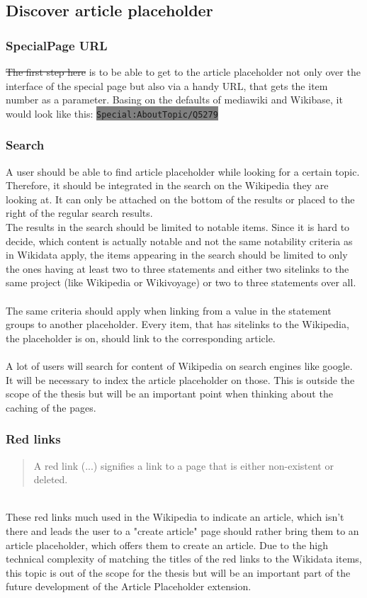 \documentclass[11pt]{article}
\begin{document}
\subsection{Discover article placeholder}
\subsubsection{SpecialPage URL}
\st{The first step here} is to be able to get to the article placeholder not only over the interface of the special page but also via a handy URL, that gets the item number as a parameter. Basing on the defaults of mediawiki and Wikibase, it would look like this: \colorbox{Gray}{\lstinline[basicstyle=\ttfamily\color{white}]|Special:AboutTopic/Q5279|} \\
\subsubsection{Search}
A user should be able to find article placeholder while looking for a certain topic. Therefore, it should be integrated in the search on the Wikipedia they are looking at. It can only be attached on the bottom of the results or placed to the right of the regular search results. \\
The results in the search should be limited to notable items. Since it is hard to decide, which content is actually notable and not the same notability criteria as in Wikidata apply, the items appearing in the search should be limited to only the ones having at least two to three statements and either two sitelinks to the same project (like Wikipedia or Wikivoyage) or two to three statements over all. \\
\\
The same criteria should apply when linking from a value in the statement groups to another placeholder. Every item, that has sitelinks to the Wikipedia, the placeholder is on, should link to the corresponding article. \\
\\
A lot of users will search for content of Wikipedia on search engines like google. It will be necessary to index the article placeholder on those. This is outside the scope of the thesis but will be an important point when thinking about the caching of the pages. 
\subsubsection{Red links}
\begin{quotation}
A red link (...) signifies a link to a page that is either non-existent or deleted. 
\end{quotation} \cite{wiki:01} %
\\
These red links much used in the Wikipedia to indicate an article, which isn't there and leads the user to a "create article" page should rather bring them to an article placeholder, which offers them to create an article. Due to the high technical complexity of matching the titles of the red links to the Wikidata items, this topic is out of the scope for the thesis but will be an important part of the future development of the Article Placeholder extension.
\end{document}
